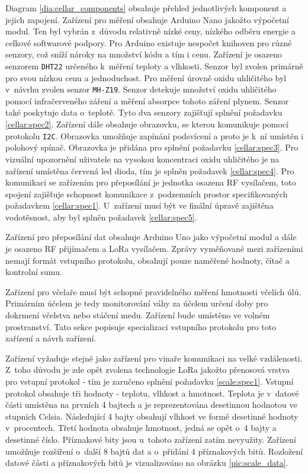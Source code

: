 Diagram \ref{dia:cellar_components} obsahuje přehled jednotlivých komponent a jejich zapojení. Zařízení pro měření obsahuje Arduino Nano jakožto výpočetní modul. Ten byl vybrán z~důvodu relativně nízké ceny, nízkého odběru energie a celkové softwarové podpory. Pro Arduino existuje nespočet knihoven pro různé senzory, což sníží nároky na množství kódu a tím i cenu. Zařízení je osazeno senzorem \texttt{DHT22} určeného k~měření teploty a vlhkosti. Senzor byl zvolen primárně pro svou nízkou cenu a jednoduchost. Pro měření úrovně oxidu uhličitého byl v~návrhu zvolen senzor \texttt{MH-Z19}. Senzor detekuje množství oxidu uhličitého pomocí infračerveného záření a měření absorpce tohoto záření plynem. Senzor také poskytuje data o~teplotě. Tyto dva senzory zajišťují splnění požadavku \ref{cellar:spec2}. Zařízení dále obsahuje obrazovku, se kterou komunikuje pomocí protokolu \texttt{I2C}. Obrazovka umožňuje zapínání podsvícení a proto je k~ní umístěn i polohový spínač. Obrazovka je přidána pro splnění požadavku \ref{cellar:spec3}. Pro vizuální upozornění uživatele na vysokou koncentraci oxidu uhličitého je na zařízení umístěna červená led dioda, tím je splněn požadavek \ref{cellar:spec4}. Pro komunikaci se zařízením pro přeposílání je jednotka osazena RF vysílačem, toto spojení zajišťuje schopnost komunikace z~podzemních prostor specifikovaných požadavkem \ref{cellar:spec1}. U~zařízení musí být ve finální úpravě zajištěna vodotěsnost, aby byl splněn požadavek \ref{cellar:spec5}.

Zařízení pro přeposílání dat obsahuje Arduino Uno jako výpočetní modul a dále je osazeno RF přijímačem a LoRa vysílačem. Zprávy vyměňované mezi zařízeními nemají formát vstupního protokolu, obsahují pouze naměřené hodnoty, čítač a kontrolní sumu.

 \label{sec:scale_design}
Zařízení pro včelaře musí být schopné pravidelného měření hmotnosti včelích úlů. Primárním účelem je tedy monitorování váhy za účelem určení doby pro dokrmení včelstva nebo stáčení medu. Zařízení bude umístěno ve volném prostranství. Tato sekce popisuje specializaci vstupního protokolu pro toto zařízení a návrh zařízení.

Zařízení vyžaduje stejně jako zařízení pro vinaře komunikaci na velké vzdálenosti. Z~toho důvodu je zde opět zvolena technologie LoRa jakožto přenosová vrstva pro vstupní protokol - tím je zaručeno splnění požadavku \ref{scale:spec1}. Vstupní protokol obsahuje tři hodnoty - teplotu, vlhkost a hmotnost. Teplota je v~datové části umístěna na prvních 4 bajtech a je reprezentována desetinnou hodnotou ve stupních Celsia. Následující 4 bajty obsahují vlhkost ve formě desetinné hodnoty v~procentech. Třetí hodnota obsahuje hmotnost, jedná se opět o~4 bajty a desetinné číslo. Příznakové bity jsou u~tohoto zařízení zatím nevyužity. Zařízení umožňuje rozšíření o~další 8 bajtů dat a o~přidání 4 příznakových bitů. Rozložení datové části a příznakových bitů je vizualizováno na obrázku \ref{pic:scale_data}.

